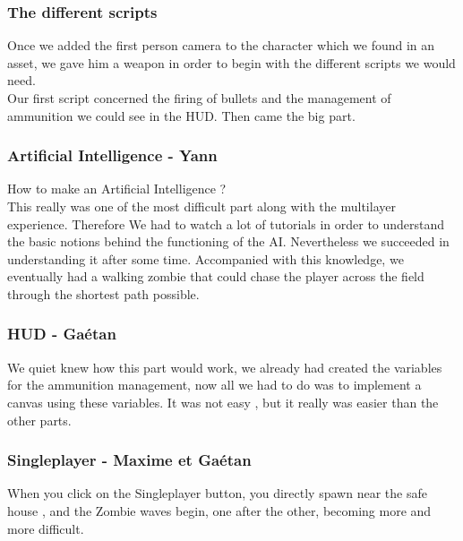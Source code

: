 \documentclass[12pt]{article}
\begin{document}
	\subsubsection{The different scripts}
    
    	Once we added the first person camera to the character which we found in an asset, we \guillemotleft \space gave him a weapon \guillemotright \space in order to begin with the different scripts we would need.\\
    Our first script concerned the firing of bullets and the management of ammunition we could see in the HUD. Then came the big part.
    
    
    
    \subsubsection{Artificial Intelligence - Yann}
    How to make an Artificial Intelligence ?\\
    This really was one of the most difficult part along with the multilayer experience. Therefore We had to watch a lot of tutorials in order to understand the basic notions behind the functioning of the AI. Nevertheless we succeeded in understanding it after some time. Accompanied with this knowledge, we eventually had a walking zombie that could chase the player across the field through the shortest path possible.
    

	\subsubsection{HUD - Ga\'etan}

		We quiet knew how this part would work, we already had created the variables for the ammunition management, now all we had to do was to implement a canvas using these variables. It was not \guillemotleft \space easy \guillemotright \space, but it really was easier than the other parts.
        
        
    \subsubsection{Singleplayer - Maxime et Ga\'etan}
        
        When you click on the Singleplayer button, you directly spawn near the \guillemotleft \space safe house \guillemotright \space, and the Zombie waves begin, one after the other, becoming more and more difficult.
        
\end{document}
